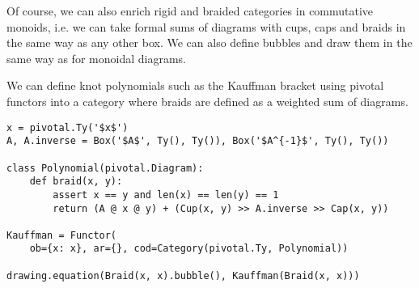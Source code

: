 Of course, we can also enrich rigid and braided categories in commutative monoids, i.e. we can take formal sums of diagrams with cups, caps and braids in the same way as any other box.
We can also define bubbles and draw them in the same way as for monoidal diagrams.

\begin{example}
We can define knot polynomials such as the Kauffman bracket using pivotal functors into a category where braids are defined as a weighted sum of diagrams.

\begin{verbatim}
x = pivotal.Ty('$x$')
A, A.inverse = Box('$A$', Ty(), Ty()), Box('$A^{-1}$', Ty(), Ty())

class Polynomial(pivotal.Diagram):
    def braid(x, y):
        assert x == y and len(x) == len(y) == 1
        return (A @ x @ y) + (Cup(x, y) >> A.inverse >> Cap(x, y))

Kauffman = Functor(
    ob={x: x}, ar={}, cod=Category(pivotal.Ty, Polynomial))

drawing.equation(Braid(x, x).bubble(), Kauffman(Braid(x, x)))
\end{verbatim}

\end{example}
